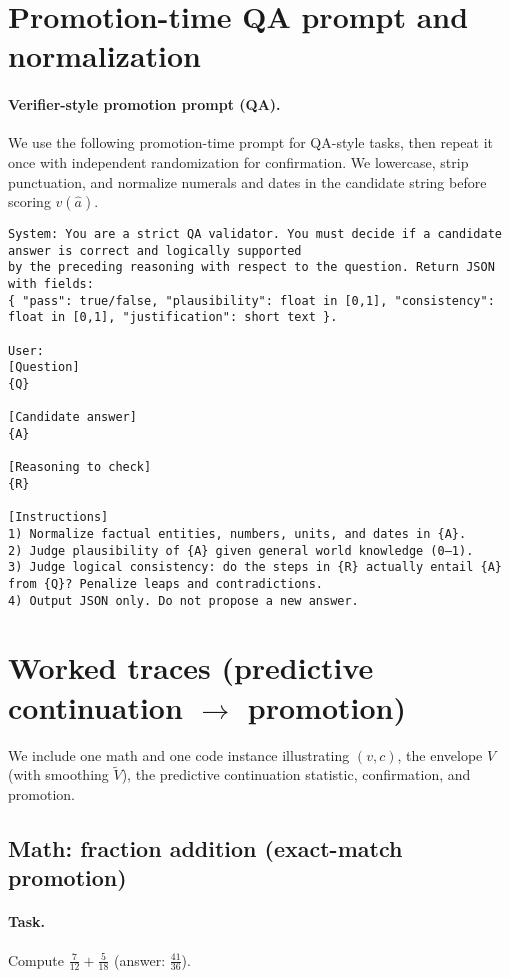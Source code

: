 \documentclass{article}
\begin{document}
\section{Promotion-time QA prompt and normalization}
\label{app:qa-prompt}
\paragraph{Verifier-style promotion prompt (QA).}
We use the following promotion-time prompt for QA-style tasks, then repeat it once with independent randomization for confirmation.
We lowercase, strip punctuation, and normalize numerals and dates in the candidate string before scoring $v(\hat a)$.
\begin{verbatim}
System: You are a strict QA validator. You must decide if a candidate answer is correct and logically supported
by the preceding reasoning with respect to the question. Return JSON with fields:
{ "pass": true/false, "plausibility": float in [0,1], "consistency": float in [0,1], "justification": short text }.

User:
[Question]
{Q}

[Candidate answer]
{A}

[Reasoning to check]
{R}

[Instructions]
1) Normalize factual entities, numbers, units, and dates in {A}.
2) Judge plausibility of {A} given general world knowledge (0–1).
3) Judge logical consistency: do the steps in {R} actually entail {A} from {Q}? Penalize leaps and contradictions.
4) Output JSON only. Do not propose a new answer.
\end{verbatim}


\section{Worked traces (predictive continuation $\to$ promotion)}
\label{app:worked-traces}
We include one math and one code instance illustrating $(v,c)$, the envelope $V$ (with smoothing $\tilde V$), the predictive continuation statistic, confirmation, and promotion.

\subsection{Math: fraction addition (exact-match promotion)}
\paragraph{Task.} Compute $\frac{7}{12}+\frac{5}{18}$ (answer: $\frac{41}{36}$).
\end{document}
